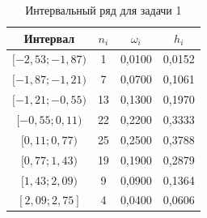 \begin{table}[H]
\centering
\caption{Интервальный ряд для задачи 1}
\small
\begin{tabular}{cccc}
\toprule
Интервал & $n_i$ & $\omega_i$ & $h_i$ \\
\midrule
$[-2,53; -1,87)$ & 1 & 0,0100 & 0,0152 \\
$[-1,87; -1,21)$ & 7 & 0,0700 & 0,1061 \\
$[-1,21; -0,55)$ & 13 & 0,1300 & 0,1970 \\
$[-0,55; 0,11)$ & 22 & 0,2200 & 0,3333 \\
$[0,11; 0,77)$ & 25 & 0,2500 & 0,3788 \\
$[0,77; 1,43)$ & 19 & 0,1900 & 0,2879 \\
$[1,43; 2,09)$ & 9 & 0,0900 & 0,1364 \\
$[2,09; 2,75]$ & 4 & 0,0400 & 0,0606 \\
\bottomrule
\end{tabular}
\end{table}
